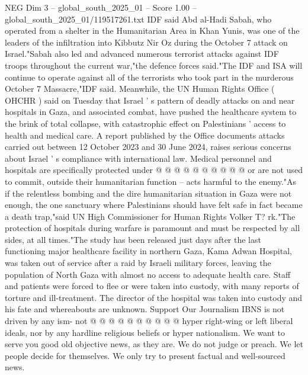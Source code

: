 \begin{textsample}{NEG Dim 3 – global\_south\_2025\_01 – Score 1.00 – global\_south\_2025\_01/119517261.txt}  \label{ex:f3_neg_076}
IDF said Abd al-Hadi Sabah, who operated from a shelter in the Humanitarian Area in Khan Yunis, was one of the leaders of the infiltration into Kibbutz Nir Oz during the October 7 attack on Israel."Sabah also led and advanced numerous terrorist attacks against IDF troops throughout the current war,"the defence forces said."The IDF and ISA will continue to operate against all of the terrorists who took part in the murderous October 7 Massacre,"IDF said.
Meanwhile, the UN Human Rights Office ( OHCHR ) said on Tuesday that Israel ' s pattern of deadly attacks on and near hospitals in Gaza, and associated combat, have pushed the healthcare system to the brink of total collapse, with catastrophic effect on Palestinians ' access to health and medical care.
A report published by the Office documents attacks carried out between 12 October 2023 and 30 June 2024, raises serious concerns about Israel ' s compliance with international law.
Medical personnel and hospitals are specifically protected under @ @ @ @ @ @ @ @ @ @ or are not used to commit, outside their humanitarian function -- acts harmful to the enemy."As if the relentless bombing and the dire humanitarian situation in Gaza were not enough, the one sanctuary where Palestinians should have felt safe in fact became a death trap,"said UN High Commissioner for Human Rights Volker T? rk."The protection of hospitals during warfare is paramount and must be respected by all sides, at all times."The study has been released just days after the last functioning major healthcare facility in northern Gaza, Kama Adwan Hospital, was taken out of service after a raid by Israeli military forces, leaving the population of North Gaza with almost no access to adequate health care.
Staff and patients were forced to flee or were taken into custody, with many reports of torture and ill-treatment.
The director of the hospital was taken into custody and his fate and whereabouts are unknown.
Support Our Journalism IBNS is not driven by any ism- not @ @ @ @ @ @ @ @ @ @ hyper right-wing or left liberal ideals, nor by any hardline religious beliefs or hyper nationalism.
We want to serve you good old objective news, as they are.
We do not judge or preach.
We let people decide for themselves.
We only try to present factual and well-sourced news.

\end{textsample}
